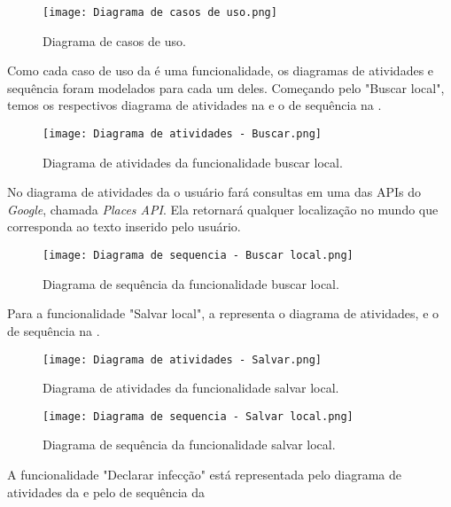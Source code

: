 \begin{figure}[!htb]
  \centering
  \texttt{[image: Diagrama de casos de uso.png]}
  \caption{Diagrama de casos de uso.}
  \label{fig:usecasesdiagram}
\end{figure}

Como cada caso de uso da  é uma funcionalidade, os diagramas de atividades e sequência foram modelados para cada um deles. Começando pelo "Buscar local", temos os respectivos diagrama de atividades na  e o de sequência na .

\begin{figure}[!htb]
  \centering
  \texttt{[image: Diagrama de atividades - Buscar.png]}
  \caption{Diagrama de atividades da funcionalidade buscar local.}
  \label{fig:atividadebuscar}
\end{figure}

No diagrama de atividades da  o usuário fará consultas em uma das APIs do \textit{Google}, chamada \textit{Places API}. Ela retornará qualquer localização no mundo que corresponda ao texto inserido pelo usuário.

\begin{figure}[!htb]
  \centering
  \texttt{[image: Diagrama de sequencia - Buscar local.png]}
  \caption{Diagrama de sequência da funcionalidade buscar local.}
  \label{fig:sequenciabuscar}
\end{figure}

Para a funcionalidade "Salvar local", a  representa o diagrama de atividades, e o de sequência na .

\begin{figure}[!htb]
  \centering
  \texttt{[image: Diagrama de atividades - Salvar.png]}
  \caption{Diagrama de atividades da funcionalidade salvar local.}
  \label{fig:atividadesalvar}
\end{figure}

\begin{figure}[!htb]
  \centering
  \texttt{[image: Diagrama de sequencia - Salvar local.png]}
  \caption{Diagrama de sequência da funcionalidade salvar local.}
  \label{fig:sequenciasalvar}
\end{figure}



A funcionalidade "Declarar infecção" está representada pelo diagrama de atividades da  e pelo de sequência da 


